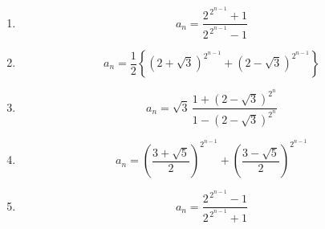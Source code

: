 \begin{enumerate}[label=\textbf{問\arabic*.},leftmargin=3.8em,format=\bookitemlink{practice-advanced}{answer}{problem}]
        \item \[
            a_n=
            \frac{2^{\,2^{n-1}}+1}
            {2^{\,2^{n-1}}-1}
          \]
        \item \[
            a_n=
            \frac12\left\{
            (2+\sqrt3)^{2^{n-1}}
            +
            (2-\sqrt3)^{2^{n-1}}
            \right\}
          \]
        \item \[
            a_n=
            \sqrt3\,
            \frac{1+(2-\sqrt3)^{2^n}}
            {1-(2-\sqrt3)^{2^n}}
          \]
        \item \[
            a_n=
            \left(\frac{3+\sqrt5}{2}\right)^{2^{n-1}}
            +
            \left(\frac{3-\sqrt5}{2}\right)^{2^{n-1}}
          \]
        \item \[
            a_n=
            \frac{2^{\,2^{n-1}}-1}
            {2^{\,2^{n-1}}+1}
          \]
      \end{enumerate}

